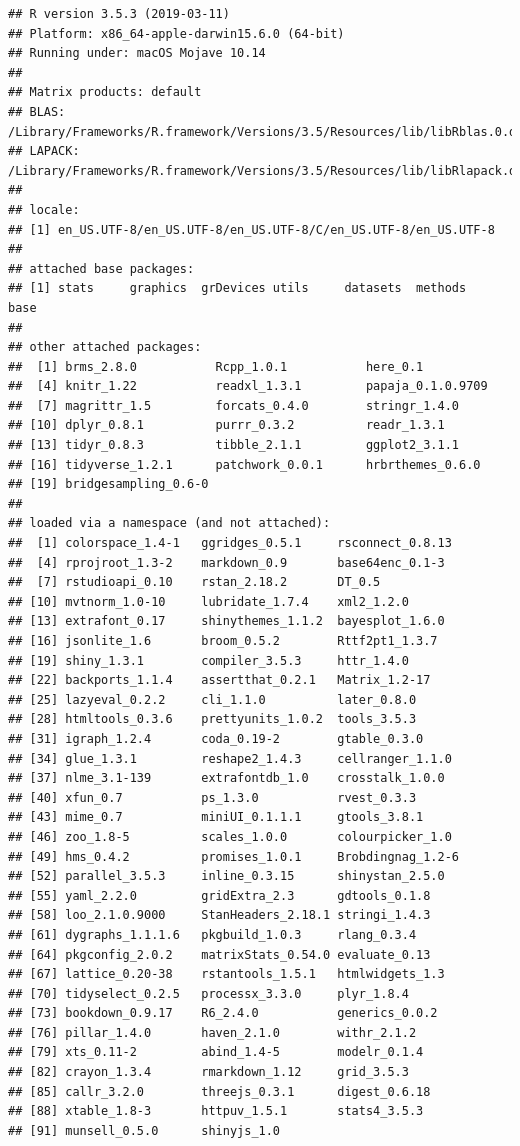\documentclass[floatsintext,doc]{apa6}
\begin{document}
\begin{verbatim}
## R version 3.5.3 (2019-03-11)
## Platform: x86_64-apple-darwin15.6.0 (64-bit)
## Running under: macOS Mojave 10.14
## 
## Matrix products: default
## BLAS: /Library/Frameworks/R.framework/Versions/3.5/Resources/lib/libRblas.0.dylib
## LAPACK: /Library/Frameworks/R.framework/Versions/3.5/Resources/lib/libRlapack.dylib
## 
## locale:
## [1] en_US.UTF-8/en_US.UTF-8/en_US.UTF-8/C/en_US.UTF-8/en_US.UTF-8
## 
## attached base packages:
## [1] stats     graphics  grDevices utils     datasets  methods   base     
## 
## other attached packages:
##  [1] brms_2.8.0           Rcpp_1.0.1           here_0.1            
##  [4] knitr_1.22           readxl_1.3.1         papaja_0.1.0.9709   
##  [7] magrittr_1.5         forcats_0.4.0        stringr_1.4.0       
## [10] dplyr_0.8.1          purrr_0.3.2          readr_1.3.1         
## [13] tidyr_0.8.3          tibble_2.1.1         ggplot2_3.1.1       
## [16] tidyverse_1.2.1      patchwork_0.0.1      hrbrthemes_0.6.0    
## [19] bridgesampling_0.6-0
## 
## loaded via a namespace (and not attached):
##  [1] colorspace_1.4-1   ggridges_0.5.1     rsconnect_0.8.13  
##  [4] rprojroot_1.3-2    markdown_0.9       base64enc_0.1-3   
##  [7] rstudioapi_0.10    rstan_2.18.2       DT_0.5            
## [10] mvtnorm_1.0-10     lubridate_1.7.4    xml2_1.2.0        
## [13] extrafont_0.17     shinythemes_1.1.2  bayesplot_1.6.0   
## [16] jsonlite_1.6       broom_0.5.2        Rttf2pt1_1.3.7    
## [19] shiny_1.3.1        compiler_3.5.3     httr_1.4.0        
## [22] backports_1.1.4    assertthat_0.2.1   Matrix_1.2-17     
## [25] lazyeval_0.2.2     cli_1.1.0          later_0.8.0       
## [28] htmltools_0.3.6    prettyunits_1.0.2  tools_3.5.3       
## [31] igraph_1.2.4       coda_0.19-2        gtable_0.3.0      
## [34] glue_1.3.1         reshape2_1.4.3     cellranger_1.1.0  
## [37] nlme_3.1-139       extrafontdb_1.0    crosstalk_1.0.0   
## [40] xfun_0.7           ps_1.3.0           rvest_0.3.3       
## [43] mime_0.7           miniUI_0.1.1.1     gtools_3.8.1      
## [46] zoo_1.8-5          scales_1.0.0       colourpicker_1.0  
## [49] hms_0.4.2          promises_1.0.1     Brobdingnag_1.2-6 
## [52] parallel_3.5.3     inline_0.3.15      shinystan_2.5.0   
## [55] yaml_2.2.0         gridExtra_2.3      gdtools_0.1.8     
## [58] loo_2.1.0.9000     StanHeaders_2.18.1 stringi_1.4.3     
## [61] dygraphs_1.1.1.6   pkgbuild_1.0.3     rlang_0.3.4       
## [64] pkgconfig_2.0.2    matrixStats_0.54.0 evaluate_0.13     
## [67] lattice_0.20-38    rstantools_1.5.1   htmlwidgets_1.3   
## [70] tidyselect_0.2.5   processx_3.3.0     plyr_1.8.4        
## [73] bookdown_0.9.17    R6_2.4.0           generics_0.0.2    
## [76] pillar_1.4.0       haven_2.1.0        withr_2.1.2       
## [79] xts_0.11-2         abind_1.4-5        modelr_0.1.4      
## [82] crayon_1.3.4       rmarkdown_1.12     grid_3.5.3        
## [85] callr_3.2.0        threejs_0.3.1      digest_0.6.18     
## [88] xtable_1.8-3       httpuv_1.5.1       stats4_3.5.3      
## [91] munsell_0.5.0      shinyjs_1.0
\end{verbatim}
\end{document}
